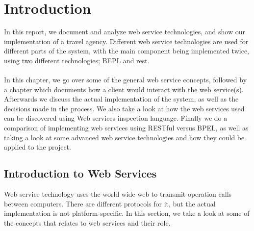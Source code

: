 \chapter{Introduction}
In this report, we document and analyze web service technologies, and show our implementation of a travel agency. Different web service technologies are used for different parts of the system, with the main component being implemented twice, using two different technologies; BEPL and rest.\\\\
In this chapter, we go over some of the general web service concepts, followed by a chapter which documents how a client would interact with the web service(s). Afterwards we discuss the actual implementation of the system, as well as the decisions made in the process. We also take a look at how the web services used can be discovered using Web services inspection language. Finally we do a comparison of implementing web services using RESTful versus BPEL, as well as taking a look at some advanced web service technologies and how they could be applied to the project.


\section{Introduction to Web Services}

Web service technology uses the world wide web to transmit operation calls between computers. There are different protocols for it, but the actual implementation is not platform-specific. In this section, we take a look at some of the concepts that relates to web services and their role. 


